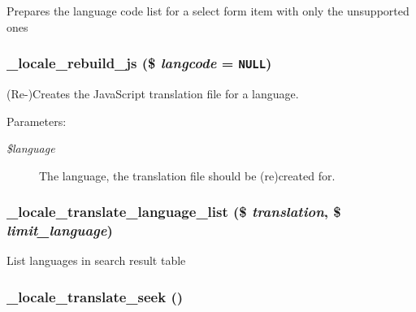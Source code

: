Prepares the language code list for a select form item with only the unsupported ones \hypertarget{group__locale_g1235873f9a64b606895cd77628bffabc}{
\subsubsection[{\_\-locale\_\-rebuild\_\-js}]{\setlength{\rightskip}{0pt plus 5cm}\_\-locale\_\-rebuild\_\-js (\$ {\em langcode} = {\tt NULL})}}
\label{group__locale_g1235873f9a64b606895cd77628bffabc}


(Re-)Creates the JavaScript translation file for a language.

\begin{Desc}
\item[Parameters:]
\begin{description}
\item[{\em \$language}]The language, the translation file should be (re)created for. \end{description}
\end{Desc}
\hypertarget{group__locale_gcf9e97475d1e1ffaaf336e3a943163a2}{
\subsubsection[{\_\-locale\_\-translate\_\-language\_\-list}]{\setlength{\rightskip}{0pt plus 5cm}\_\-locale\_\-translate\_\-language\_\-list (\$ {\em translation}, \/  \$ {\em limit\_\-language})}}
\label{group__locale_gcf9e97475d1e1ffaaf336e3a943163a2}


List languages in search result table \hypertarget{group__locale_g006049082d29be75fd8ad396beda5883}{
\subsubsection[{\_\-locale\_\-translate\_\-seek}]{\setlength{\rightskip}{0pt plus 5cm}\_\-locale\_\-translate\_\-seek ()}}
\label{group__locale_g006049082d29be75fd8ad396beda5883}


